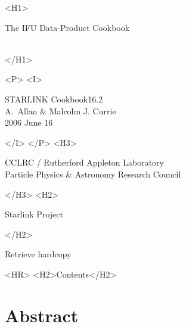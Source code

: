 \documentclass[twoside,11pt]{article}
\newcommand{\stardoccategory}  {STARLINK Cookbook}
\newcommand{\stardocsource}    {sc\stardocnumber}
\newcommand{\stardocnumber}    {16.2}
\newcommand{\stardocauthors}   {A.~Allan \& Malcolm J. Currie}
\newcommand{\stardocdate}      {2006 June 16}
\newcommand{\stardoctitle}     {The IFU Data-Product Cookbook}
\newcommand{\htmladdnormallink}[2]{#1}
\newcommand{\htmladdimg}[1]{}
\newcommand{\htmlref}[2]{#1}
\newcommand{\htmladdtonavigation}[1]{}
\newcommand{\xlabel}[1]{}
\newcommand{\latexonlytoc}[0]{\tableofcontents}
\begin{document}
\begin{htmlonly}
   \xlabel{}
   \begin{rawhtml} <H1> \end{rawhtml}
      \stardoctitle\\
      \stardocversion\\
      \stardocmanual
   \begin{rawhtml} </H1> \end{rawhtml}

   \htmladdimg{sc16_cover.gif}


   \begin{rawhtml} <P> <I> \end{rawhtml}
   \stardoccategory \stardocnumber \\
   \stardocauthors \\
   \stardocdate
   \begin{rawhtml} </I> </P> <H3> \end{rawhtml}
      \htmladdnormallink{CCLRC}{http://www.cclrc.ac.uk} /
      \htmladdnormallink{Rutherford Appleton Laboratory}
                        {http://www.cclrc.ac.uk/ral} \\
      \htmladdnormallink{Particle Physics \& Astronomy Research Council}
                        {http://www.pparc.ac.uk} \\
   \begin{rawhtml} </H3> <H2> \end{rawhtml}
      \htmladdnormallink{Starlink Project}{http://star-www.rl.ac.uk/}
   \begin{rawhtml} </H2> \end{rawhtml}
   \htmladdnormallink{\htmladdimg{source.gif} Retrieve hardcopy}
      {http://star-www.rl.ac.uk/cgi-bin/hcserver?\stardocsource}\\

  \label{stardoccontents}
  \begin{rawhtml} 
    <HR>
    <H2>Contents</H2>
  \end{rawhtml}
  \renewcommand{\latexonlytoc}[0]{}

  \section{\xlabel{abstract}Abstract}
\end{htmlonly}
\end{document}
